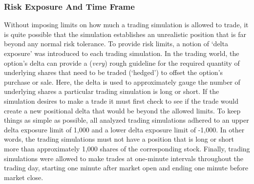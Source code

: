\documentclass[12pt, a4paper, notitlepage]{article}
\numberwithin{equation}{subsection}
\numberwithin{figure}{subsection}
\numberwithin{table}{subsection}
\newcommand{\newpar}{\newline \newline}
\begin{document}
\subsubsection{Risk Exposure And Time Frame}
\label{subsec:RiskExposureAndTimeFrame}
Without imposing limits on how much a trading simulation is allowed to trade, it is quite possible that the simulation establishes an unrealistic position that is far beyond any normal risk tolerance.  To provide risk limits, a notion of `delta exposure' was introduced to each trading simulation.  In the trading world, the option's delta can provide a (\textit{very}) rough guideline for the required quantity of underlying shares that need to be traded (`hedged') to offset the option's purchase or sale.  Here, the delta is used to approximately gauge the number of underlying shares a particular trading simulation is long or short.  If the simulation desires to make a trade it must first check to see if the trade would create a new positional delta that would be beyond the allowed limits.  To keep things as simple as possible, all analyzed trading simulations adhered to an upper delta exposure limit of 1,000 and a lower delta exposure limit of -1,000.  In other words, the trading simulations must not have a position that is long or short more than approximately 1,000 shares of the corresponding stock.
\newpar
Finally, trading simulations were allowed to make trades at one-minute intervals throughout the trading day, starting one minute after market open and ending one minute before market close.
\end{document}
